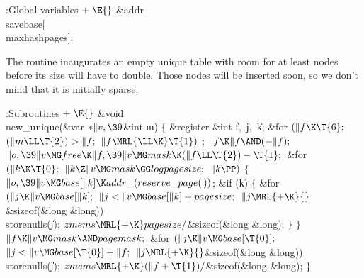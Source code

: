 \B{}:Global variables\X${}\mathrel+\E{}$\6
\&{addr} \\{savebase}[\\{maxhashpages}];\par
\fi

The  routine inaugurates an empty
unique table with room for
at least  nodes before its size will have to double.
Those nodes will be inserted soon, so we don't mind
that it is initially sparse.

\Y\B\4:Subroutines\X${}\mathrel+\E{}$\6
\&{void} \\{new\_unique}(\&{var} ${}{*}\|v,\39{}$\&{int} \|m)\1\1\2\2\6
${}\{{}$\1\6
\&{register} \&{int} \|f${},{}$ \|j${},{}$ \|k;\7
\&{for} ${}(\|f\K\T{6};{}$ ${}(\|m\LL\T{2})>\|f;{}$ ${}\|f\MRL{{\LL}{\K}}%
\T{1}){}$\1\5
;\2\6
${}\|f\K\|f\AND({-}\|f);{}$\6
${}\|o,\39\|v\MG\\{free}\K\|f,\39\|v\MG\\{mask}\K(\|f\LL\T{2})-\T{1};{}$\6
\&{for} ${}(\|k\K\T{0};{}$ ${}\|k\Z\|v\MG\\{mask}\GG\\{logpagesize};{}$ ${}\|k%
\PP){}$\5
${}\{{}$\1\6
${}\|o,\39\|v\MG\\{base}[\|k]\K\\{addr\_}(\\{reserve\_page}(\,)){}$;\6
\&{if} (\|k)\5
${}\{{}$\1\6
\&{for} ${}(\|j\K\|v\MG\\{base}[\|k];{}$ ${}\|j<\|v\MG\\{base}[\|k]+%
\\{pagesize};{}$ ${}\|j\MRL{+{\K}}{}$\&{sizeof}(\&{long} \&{long}))\1\5
\\{storenulls}(\|j);\2\6
${}\\{zmems}\MRL{+{\K}}\\{pagesize}/{}$\&{sizeof}(\&{long} \&{long});\6
\4${}\}{}$\2\6
\4${}\}{}$\2\6
${}\|f\K\|v\MG\\{mask}\AND\\{pagemask};{}$\6
\&{for} ${}(\|j\K\|v\MG\\{base}[\T{0}];{}$ ${}\|j<\|v\MG\\{base}[\T{0}]+\|f;{}$
${}\|j\MRL{+{\K}}{}$\&{sizeof}(\&{long} \&{long}))\1\5
\\{storenulls}(\|j);\2\6
${}\\{zmems}\MRL{+{\K}}(\|f+\T{1})/{}$\&{sizeof}(\&{long} \&{long});\6
\4${}\}{}$\2\par
\fi


